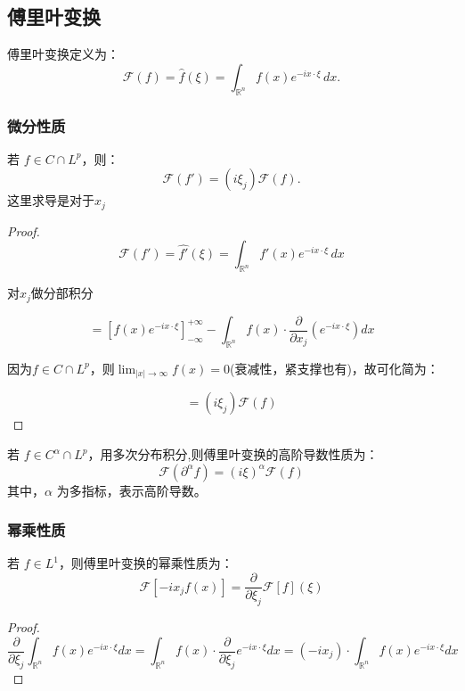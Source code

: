 \documentclass[12pt,a4paper]{article}
\numberwithin{subsection}{section}
\numberwithin{subsubsection}{subsection}
\theoremstyle{plain}
\theoremstyle{definition}
\theoremstyle{remark}
\begin{document}
	\subsection{傅里叶变换}
	傅里叶变换定义为：
	\begin{equation}
		\mathcal{F}(f) = \hat{f}(\xi) = \int_{\mathbb{R}^n} f(x) e^{-i x \cdot \xi} \, dx.
	\end{equation}
	
	\subsubsection{微分性质}
	若 \( f \in C \cap L^p \)，则：
	\begin{equation}
		\mathcal{F}(f') = (i \xi_j) \mathcal{F}(f).
	\end{equation}
	这里求导是对于$x_j$
	
	\begin{proof}
		\[
			\mathcal{F}(f') = \hat{f'}(\xi) = \int_{\mathbb{R}^n} f'(x) e^{-i x \cdot \xi} \, dx
		\]
		
		对$x_j$做分部积分
		
	\[
			= \left[ f(x) e^{-i x \cdot \xi} \right]_{-\infty}^{+\infty} - \int_{\mathbb{R}^n} f(x) \cdot \frac{\partial}{\partial x_j} \left( e^{-i x \cdot \xi} \right) dx
		\]	
		
		因为\( f \in C \cap L^p \)，则$\lim_{|x| \to \infty} f(x) = 0$(衰减性，紧支撑也有)，故可化简为：
		
	\[	
			= (i \xi_j) \mathcal{F}(f)
	\]	
	\end{proof}
	
	若 \( f \in C^\alpha \cap L^p \)，用多次分布积分,则傅里叶变换的高阶导数性质为：
	\begin{equation}\label{weifen}
		\mathcal{F}(\partial^\alpha f) = (i \xi)^\alpha \mathcal{F}(f)
	\end{equation}
	其中，\(\alpha\) 为多指标，表示高阶导数。
	
	
		\subsubsection{幂乘性质}
	若 \( f \in L^1 \)，则傅里叶变换的幂乘性质为：
	\begin{equation}
		\mathcal{F}[-i x_j f(x)] = \frac{\partial}{\partial \xi_j} \mathcal{F}[f](\xi)
	\end{equation}
	
	\begin{proof}
		\[	
		\frac{\partial}{\partial \xi_j} \int_{\mathbb{R}^n} f(x) e^{-i x \cdot \xi} dx = \int_{\mathbb{R}^n} f(x) \cdot \frac{\partial}{\partial \xi_j} e^{-i x \cdot \xi} dx= (-i x_j) \cdot \int_{\mathbb{R}^n} f(x) e^{-i x \cdot \xi} dx
	\]	
	
\end{proof}
	
\end{document}
